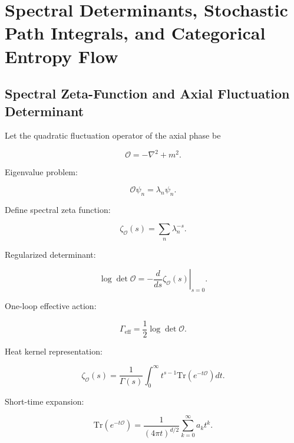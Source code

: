 \documentclass[12pt]{article}
\begin{document}
\section{Spectral Determinants, Stochastic Path Integrals, and Categorical Entropy Flow}

\subsection{Spectral Zeta-Function and Axial Fluctuation Determinant}

Let the quadratic fluctuation operator of the axial phase be

\begin{equation}
\mathcal{O}
=
-\nabla^2 + m^2.
\end{equation}

Eigenvalue problem:

\begin{equation}
\mathcal{O} \psi_n = \lambda_n \psi_n.
\end{equation}

Define spectral zeta function:

\begin{equation}
\zeta_{\mathcal{O}}(s)
=
\sum_n \lambda_n^{-s}.
\end{equation}

Regularized determinant:

\begin{equation}
\log \det \mathcal{O}
=
- \left. \frac{d}{ds} \zeta_{\mathcal{O}}(s) \right|_{s=0}.
\end{equation}

One-loop effective action:

\begin{equation}
\Gamma_{\mathrm{eff}}
=
\frac{1}{2}
\log \det \mathcal{O}.
\end{equation}

Heat kernel representation:

\begin{equation}
\zeta_{\mathcal{O}}(s)
=
\frac{1}{\Gamma(s)}
\int_0^\infty
t^{s-1}
\mathrm{Tr}
\left(
e^{-t\mathcal{O}}
\right)
dt.
\end{equation}

Short-time expansion:

\begin{equation}
\mathrm{Tr}
\left(
e^{-t\mathcal{O}}
\right)
=
\frac{1}{(4\pi t)^{d/2}}
\sum_{k=0}^\infty
a_k t^k.
\end{equation}
\end{document}
